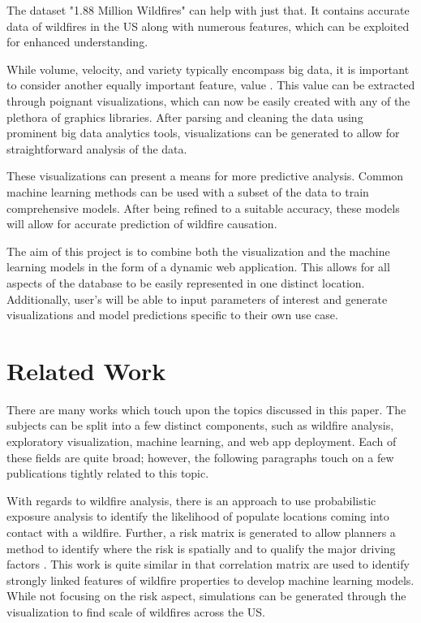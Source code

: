 \documentclass[conference]{IEEEtran}
\begin{document}
The dataset "1.88 Million Wildfires" can help with just that. It contains accurate data of wildfires in the US along with numerous features, which can be exploited for enhanced understanding. \par

While volume, velocity, and variety typically encompass big data, it is important to consider another equally important feature, value \cite{DBLP:journals/corr/abs-1709-07493}. This value can be extracted through poignant visualizations, which can now be easily created with any of the plethora of graphics libraries. After parsing and cleaning the data using prominent big data analytics tools, visualizations can be generated to allow for straightforward analysis of the data. \par

These visualizations can present a means for more predictive analysis. Common machine learning methods can be used with a subset of the data to train comprehensive models. After being refined to a suitable accuracy, these models will allow for accurate prediction of wildfire causation. \par

The aim of this project is to combine both the visualization and the machine learning models in the form of a dynamic web application. This allows for all aspects of the database to be easily represented in one distinct location. Additionally, user's will be able to input parameters of interest and generate visualizations and model predictions specific to their own use case. \par

\section{Related Work}
There are many works which touch upon the topics discussed in this paper. The subjects can be split into a few distinct components, such as wildfire analysis, exploratory visualization, machine learning, and web app deployment. Each of these fields are quite broad; however, the following paragraphs touch on a few publications tightly related to this topic. \par

With regards to wildfire analysis, there is an approach to use probabilistic exposure analysis to identify the likelihood of populate locations coming into contact with a wildfire. Further, a risk matrix is generated to allow planners a method to identify where the risk is spatially and to qualify the major driving factors \cite{HAAS201344}. This work is quite similar in that correlation matrix are used to identify strongly linked features of wildfire properties to develop machine learning models. While not focusing on the risk aspect, simulations can be generated through the visualization to find scale of wildfires across the US. \par
\end{document}
